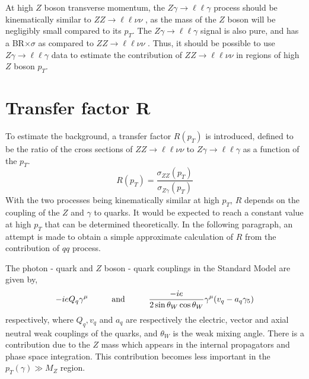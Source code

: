 \documentclass[11pt,a4paper,openright,twoside]{report}
\newcommand{\ZZ}{$ZZ\to \ell\ell\nu\nu$ }
\newcommand{\Zg}{$Z\gamma\to \ell\ell\gamma$ }
\begin{document}
At high $Z $ boson transverse momentum, the \Zg process should be kinematically similar to \ZZ, as the mass of the $Z$ boson will be negligibly small compared to its $p_T$. The \Zg signal is also pure, and has a BR$\times\sigma$ as compared to \ZZ. Thus, it should be possible to use \Zg data to estimate the contribution of \ZZ in regions of high $Z$ boson $p_T$.

\section{Transfer factor R}
To estimate the background, a transfer factor $R(p_T)$ is introduced, defined to be the ratio of the cross sections of \ZZ to \Zg as a function of the $p_T$.
\begin{equation}
	R(p_{T}) = \frac{\sigma_{ZZ}(p_{T})}{\sigma_{Z\gamma}(p_T)}
\end{equation}
With the two processes being kinematically similar at high $p_T$, $R$ depends on the coupling of the $Z$ and $\gamma$ to quarks. It would be expected to reach a constant value at high $p_T$ that can be determined theoretically. In the following paragraph, an attempt is made to obtain a simple approximate calculation of $R$ from the contribution of $qq$ process.

The photon - quark and $Z$ boson - quark couplings in the Standard Model are given by,
\begin{equation}
	-ieQ_q\gamma^{\mu} \hspace{1 cm} \text{and} \hspace{1 cm}\frac{-ie}{2 \sin\theta_W \cos\theta_W}\gamma^{\mu}(v_q - a_q\gamma_5)
\end{equation}
respectively, where $Q_q,v_q$ and $a_q$ are respectively the electric, vector and axial neutral weak couplings of the quarks, and $\theta_W$ is the weak mixing angle. There is a contribution due to the $Z$ mass which appears in the internal propagators and phase space integration. This contribution becomes less important in the $p_T(\gamma)\gg M_Z$ region.
\end{document}
